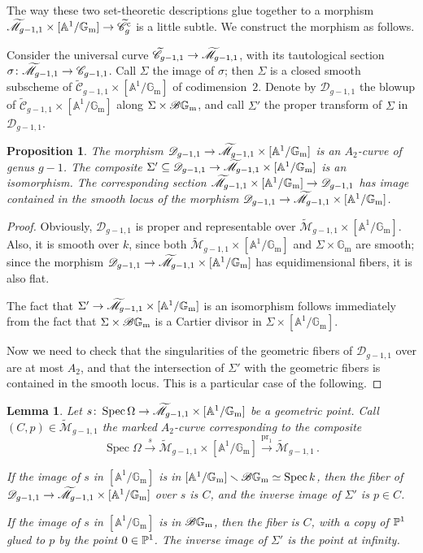 \documentclass[a4paper, 10pt]{amsart}
\numberwithin{equation}{section}
\numberwithin{subsection}{section}
\newtheorem{proposition}[theorem]{Proposition}
\newtheorem{lemma}[theorem]{Lemma}
\theoremstyle{definition}
\theoremstyle{remark}
\renewcommand{\mathcal}{\mathscr}
\newcommand\cC{\mathcal{C}} \newcommand\cD{\mathcal{D}}
\renewcommand\AA{\mathbb{A}} \newcommand\BB{\mathbb{B}}
\newcommand\GG{\mathbb{G}} \newcommand\HH{\mathbb{H}}
\newcommand\rmm{\mathrm{m}} \newcommand\rmn{\mathrm{n}}
\newcommand\arr{\ifinner\to\else\longrightarrow\fi}
\newcommand{\xarr}{\xrightarrow}
\newcommand\spec{\operatorname{Spec}}
\newcommand\pr{\operatorname{pr}}
\renewcommand{\setminus}{\smallsetminus}
\newcommand{\gm}{\GG_{\rmm}}
\newcommand{\Ctilde}{\widetilde{\mathcal C}}
\newcommand{\cu}{^{\rm c}}
\newcommand{\ag}{[\AA^{1}/\gm]}
\newcommand{\mt}{\widetilde{\mathcal M}}
\begin{document}
The way these two set-theoretic descriptions glue together to a morphism $\mt_{g-1, 1} \times \ag \arr \Ctilde\cu_{g}$ is a little subtle. We construct the morphism as follows.
	
	Consider the universal curve $\Ctilde_{g-1,1} \arr \mt_{g-1,1}$, with its tautological section $\sigma\colon \mt_{g-1,1} \arr \cC_{g-1, 1}$. Call $\Sigma$ the image of $\sigma$; then $\Sigma$ is a closed smooth subscheme of $\Ctilde_{g-1, 1} \times \ag$ of codimension~$2$. Denote by $\cD_{g-1,1}$ the blowup of $\Ctilde_{g-1, 1} \times \ag$ along $\Sigma \times \cB\gm$, and call $\Sigma'$ the proper transform of $\Sigma$ in $\cD_{g-1, 1}$.
	
	\begin{proposition}
		The morphism $\cD_{g-1,1} \arr \mt_{g-1,1}\times \ag$ is an $A_{2}$-curve of genus $g-1$. The composite $\Sigma' \subseteq \cD_{g-1,1} \arr \mt_{g-1,1}\times \ag$ is an isomorphism. The corresponding section $\mt_{g-1,1}\times \ag \arr \cD_{g-1,1}$ has image contained in the smooth locus of the morphism $\cD_{g-1,1} \arr \mt_{g-1,1}\times \ag$.
	\end{proposition}
	
	\begin{proof}
		Obviously, $\cD_{g-1,1}$ is proper and representable over $\mt_{g-1,1}\times \ag$. Also, it is smooth over $k$, since both $\mt_{g-1,1}\times \ag$ and $\Sigma\times\gm$ are smooth; since the morphism $\cD_{g-1,1} \arr \mt_{g-1,1}\times \ag$ has equidimensional fibers, it is also flat.
		
		The fact that $\Sigma' \arr \mt_{g-1,1}\times \ag$ is an isomorphism follows immediately from the fact that $\Sigma \times \cB\gm$ is a Cartier divisor in $\Sigma \times \ag$.
		
		Now we need to check that the singularities of the geometric fibers of $\cD_{g-1,1}$ over are at most $A_{2}$, and that the intersection of $\Sigma'$ with the geometric fibers is contained in the smooth locus. This is a particular case of the following.
	\end{proof}
	
	\begin{lemma}\label{lem:fibers-D}
		Let $s\colon \spec\Omega \arr \mt_{g-1,1}\times \ag$ be a geometric point. Call $(C, p) \in \mt_{g-1, 1}$ the marked $A_{2}$-curve corresponding to the composite
		\[
		\spec\Omega \xarr{s} \mt_{g-1,1}\times \ag \xarr{\pr_{1}} \mt_{g-1,1}\,.
		\]
		
		If the image of $s$ in $\ag$ is in $\ag \setminus \cB\gm \simeq \spec k$, then the fiber of $\cD_{g-1,1} \arr \mt_{g-1,1}\times \ag$ over $s$ is $C$, and the inverse image of $\Sigma'$ is $p \in C$.
		
		If the image of $s$ in $\ag$ is in $\cB\gm$, then the fiber is $C$, with a copy of $\mathbb{P}^{1}$ glued to $p$ by the point $0 \in \mathbb{P}^{1}$. The inverse image of $\Sigma'$ is the point at infinity.
	\end{lemma}
	
\end{document}
